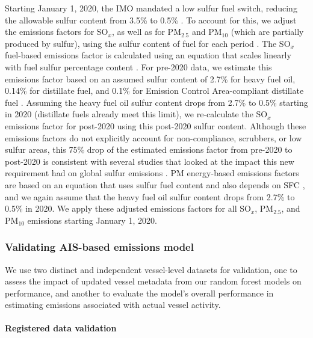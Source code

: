 \documentclass[lineno,pdflatex,sn-nature]{sn-jnl}
\begin{document}
Starting January 1, 2020, the IMO mandated a low sulfur fuel switch, reducing the allowable sulfur content from 3.5\% to 0.5\% \cite{imo_sulphur_2020}. To account for this, we adjust the emissions factors for SO$_{x}$, as well as for PM$_{2.5}$ and PM$_{10}$ (which are partially produced by sulfur), using the sulfur content of fuel for each period \cite{fourth2020greenhouse}. The SO$_{x}$ fuel-based emissions factor is calculated using an equation that scales linearly with fuel sulfur percentage content \cite{fourth2020greenhouse}. For pre-2020 data, we estimate this emissions factor based on an assumed sulfur content of 2.7\% for heavy fuel oil, 0.14\% for distillate fuel, and 0.1\% for Emission Control Area-compliant distillate fuel \cite{olmer2017greenhouse}. Assuming the heavy fuel oil sulfur content drops from 2.7\% to 0.5\% starting in 2020 (distillate fuels already meet this limit), we re-calculate the SO$_{x}$ emissions factor for post-2020 using this post-2020 sulfur content. Although these emissions factors do not explicitly account for non-compliance, scrubbers, or low sulfur areas, this 75\% drop of the estimated emissions factor from pre-2020 to post-2020 is consistent with several studies that looked at the impact this new requirement had on global sulfur emissions \cite{yuan2024abrupt, yoshioka2024warming}. PM energy-based emissions factors are based on an equation that uses sulfur fuel content and also depends on SFC \cite{fourth2020greenhouse}, and we again assume that the heavy fuel oil sulfur content drops from 2.7\% to 0.5\% in 2020. We apply these adjusted emissions factors for all SO$_{x}$, PM$_{2.5}$, and PM$_{10}$ emissions starting January 1, 2020.

\subsubsection{Validating AIS-based emissions model}\label{sec:ais-model-performance}

We use two distinct and independent vessel-level datasets for validation, one to assess the impact of updated vessel metadata from our random forest models on performance, and another to evaluate the model’s overall performance in estimating emissions associated with actual vessel activity.

\paragraph{Registered data validation}
\end{document}
